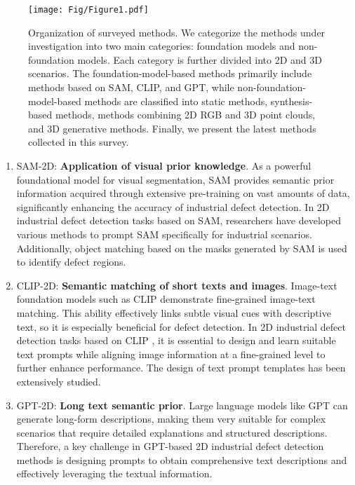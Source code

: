 \documentclass[journal,comsoc]{IEEEtran}
\begin{document}
\begin{figure*}[ht]
    \centering
    \texttt{[image: Fig/Figure1.pdf]}
    \caption{Organization of surveyed methods. We categorize the methods under investigation into two main categories: foundation models and non-foundation models. Each category is further divided into 2D and 3D scenarios. The foundation-model-based methods primarily include methods based on SAM, CLIP, and GPT, while non-foundation-model-based methods are classified into static methods, synthesis-based methods, methods combining 2D RGB and 3D point clouds, and 3D generative methods. Finally, we present the latest methods collected in this survey.}
\end{figure*}

\begin{enumerate}
    \item SAM-2D: \textbf{Application of visual prior knowledge}. As a powerful foundational model for visual segmentation, SAM provides semantic prior information acquired through extensive pre-training on vast amounts of data, significantly enhancing the accuracy of industrial defect detection. In 2D industrial defect detection tasks based on SAM, researchers have developed various methods \cite{li2024sam,cao2023segment,peng2024sam,liu2024unsupervised,li2024clipsam,yang2024spt} to prompt SAM specifically for industrial scenarios. Additionally, object matching based on the masks generated by SAM is used to identify defect regions.
    \item CLIP-2D: \textbf{Semantic matching of short texts and images}. Image-text foundation models such as CLIP demonstrate fine-grained image-text matching. This ability effectively links subtle visual cues with descriptive text, so it is especially beneficial for defect detection. In 2D industrial defect detection tasks based on CLIP \cite{jeong2023winclip,zhou2023anomalyclip,cao2025adaclip,qu2024vcp,deng2024simclip,chen2024clipad,zuo2024clipfsac,li2024clipsam,hu2024sowa,chen2023april,li2024promptad,gu2024filo,zhang2024dual}, it is essential to design and learn suitable text prompts while aligning image information at a fine-grained level to further enhance performance. The design of text prompt templates has been extensively studied.
    \item GPT-2D: \textbf{Long text semantic prior}. Large language models like GPT can generate long-form descriptions, making them very suitable for complex scenarios that require detailed explanations and structured descriptions. Therefore, a key challenge in GPT-based 2D industrial defect detection methods \cite{gu2024anomalygpt,cao2023towards,xu2024customizing,li2023myriad,zhu2024alfa,zhang2024gpt,zhang2024logicode} is designing prompts to obtain comprehensive text descriptions and effectively leveraging the textual information.

\end{enumerate}
\end{document}
